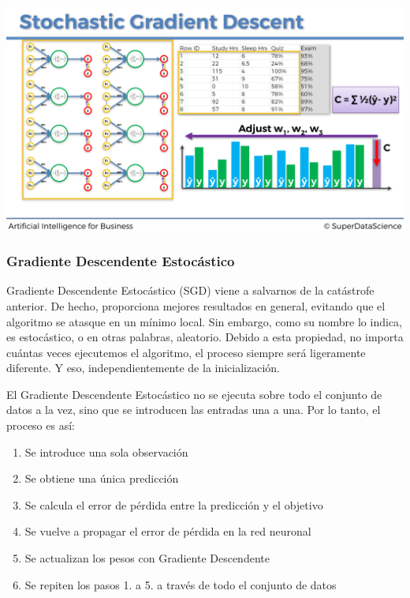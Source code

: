 \documentclass[
]{book}
\providecommand{\tightlist}{%
  \setlength{\itemsep}{0pt}\setlength{\parskip}{0pt}}
\begin{document}
\includegraphics{Images/ANN_26.png}

\hypertarget{gradiente-descendente-estocuxe1stico}{%
\subsubsection{Gradiente Descendente Estocástico}\label{gradiente-descendente-estocuxe1stico}}

Gradiente Descendente Estocástico (SGD) viene a salvarnos de la catástrofe anterior. De hecho, proporciona mejores resultados en general, evitando que el algoritmo se atasque en un mínimo local. Sin embargo, como su nombre lo indica, es estocástico, o en otras palabras, aleatorio. Debido a esta propiedad, no importa cuántas veces ejecutemos el algoritmo, el proceso siempre será ligeramente diferente. Y eso, independientemente de la inicialización.

El Gradiente Descendente Estocástico no se ejecuta sobre todo el conjunto de datos a la vez, sino que se introducen las entradas una a una. Por lo tanto, el proceso es así:

\begin{enumerate}
\def\labelenumi{\arabic{enumi}.}
\tightlist
\item
  Se introduce una sola observación
\item
  Se obtiene una única predicción
\item
  Se calcula el error de pérdida entre la predicción y el objetivo
\item
  Se vuelve a propagar el error de pérdida en la red neuronal
\item
  Se actualizan los pesos con Gradiente Descendente
\item
  Se repiten los pasos 1. a 5. a través de todo el conjunto de datos
\end{enumerate}
\end{document}

